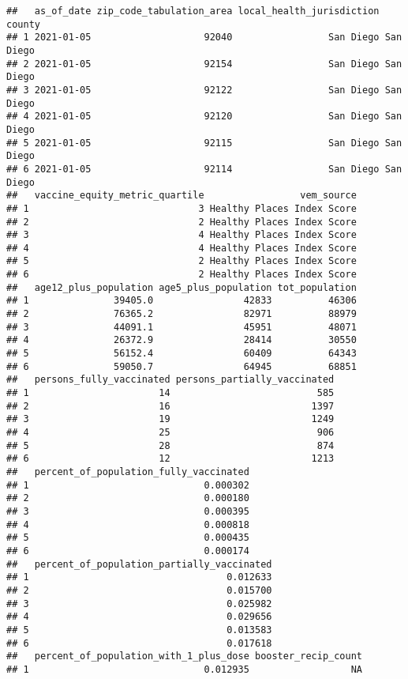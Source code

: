 \documentclass[
]{article}
\begin{document}
\begin{verbatim}
##   as_of_date zip_code_tabulation_area local_health_jurisdiction    county
## 1 2021-01-05                    92040                 San Diego San Diego
## 2 2021-01-05                    92154                 San Diego San Diego
## 3 2021-01-05                    92122                 San Diego San Diego
## 4 2021-01-05                    92120                 San Diego San Diego
## 5 2021-01-05                    92115                 San Diego San Diego
## 6 2021-01-05                    92114                 San Diego San Diego
##   vaccine_equity_metric_quartile                 vem_source
## 1                              3 Healthy Places Index Score
## 2                              2 Healthy Places Index Score
## 3                              4 Healthy Places Index Score
## 4                              4 Healthy Places Index Score
## 5                              2 Healthy Places Index Score
## 6                              2 Healthy Places Index Score
##   age12_plus_population age5_plus_population tot_population
## 1               39405.0                42833          46306
## 2               76365.2                82971          88979
## 3               44091.1                45951          48071
## 4               26372.9                28414          30550
## 5               56152.4                60409          64343
## 6               59050.7                64945          68851
##   persons_fully_vaccinated persons_partially_vaccinated
## 1                       14                          585
## 2                       16                         1397
## 3                       19                         1249
## 4                       25                          906
## 5                       28                          874
## 6                       12                         1213
##   percent_of_population_fully_vaccinated
## 1                               0.000302
## 2                               0.000180
## 3                               0.000395
## 4                               0.000818
## 5                               0.000435
## 6                               0.000174
##   percent_of_population_partially_vaccinated
## 1                                   0.012633
## 2                                   0.015700
## 3                                   0.025982
## 4                                   0.029656
## 5                                   0.013583
## 6                                   0.017618
##   percent_of_population_with_1_plus_dose booster_recip_count
## 1                               0.012935                  NA

\end{verbatim}
\end{document}
